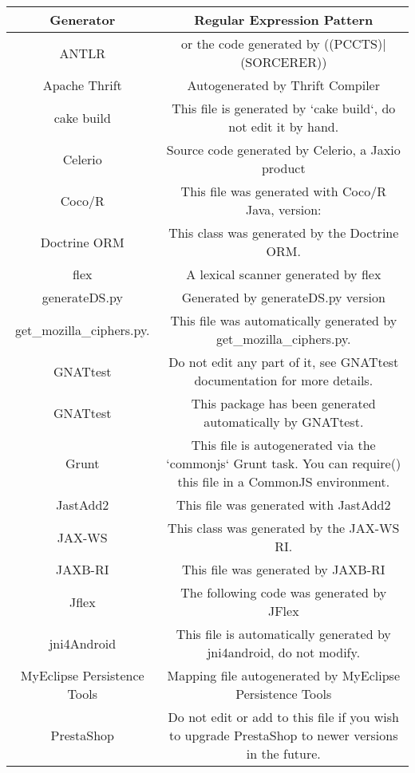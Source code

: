 \setlength{\extrarowheight}{0.2em}
\begin{table}
	\label{table:generatorPatternRepository_Git}
	\begin{tabularx}{\textwidth}{c|C}
		\textbf{Generator} & \textbf{Regular Expression Pattern} \\
		\hline
		ANTLR & or the code generated by ((PCCTS)|(SORCERER)) \\
		Apache Thrift & Autogenerated by Thrift Compiler \version \\
		cake build & This file is generated by `cake build`, do not edit it by hand. \\
		Celerio & Source code generated by Celerio, a Jaxio product \\
		Coco/R & This file was generated with Coco/R Java, version: \version \\
		Doctrine ORM & This class was generated by the Doctrine ORM. \\
		flex & A lexical scanner generated by flex \\
		generateDS.py & Generated \timestamp by generateDS.py version \version \\
		get\_mozilla\_ciphers.py. & This file was automatically generated by get\_mozilla\_ciphers.py. \\
		GNATtest & Do not edit any part of it, see GNATtest documentation for more details. \\
		GNATtest & This package has been generated automatically by GNATtest. \\
		Grunt & This file is autogenerated via the `commonjs` Grunt task. You can require() this file in a CommonJS environment. \\
		JastAdd2 & This file was generated with JastAdd2 \\
		JAX-WS & This class was generated by the JAX-WS RI. \\
		JAXB-RI & This file was generated by JAXB-RI \version \\
		Jflex & The following code was generated by JFlex \version \\
		jni4Android & This file is automatically generated by jni4android, do not modify. \\
		MyEclipse Persistence Tools & Mapping file autogenerated by MyEclipse Persistence Tools \\
		PrestaShop & Do not edit or add to this file if you wish to upgrade PrestaShop to newer versions in the future. \\
	\end{tabularx}
\end{table}
\setlength{\extrarowheight}{0em}
